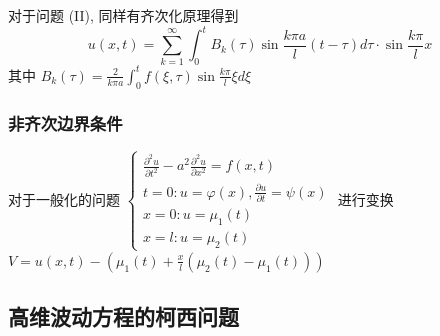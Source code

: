 \documentclass[10pt]{yerbaformat}
\begin{document}
\par 对于问题 (II), 同样有齐次化原理得到
$$
    u(x, t)=\sum_{k=1}^{\infty} \int_{0}^{t} B_{k}(\tau) \sin \frac{k \pi a}{l}(t-\tau) d \tau \cdot \sin \frac{k \pi}{l} x
$$
其中 $B_{k}(\tau)=\frac{2}{k \pi a} \int_{0}^{t} f(\xi, \tau) \sin \frac{k \pi}{l} \xi d \xi$

\subsubsection{非齐次边界条件}
\par 对于一般化的问题 $\left\{\begin{array}{l}\frac{\partial^{2} u}{\partial t^{2}}-a^{2} \frac{\partial^{2} u}{\partial x^{2}}=f(x, t) \\ t=0: u=\varphi(x), \frac{\partial u}{\partial t}=\psi(x) \\ x=0: u=\mu_{1}(t) \\ x=l: u=\mu_{2}(t)\end{array}\right.$ 进行变换 $V=u(x,t)-(\mu_{1}(t)+\frac{x}{l}\left(\mu_{2}(t)-\mu_{1}(t)\right))$

\subsection{高维波动方程的柯西问题}



\end{document}
